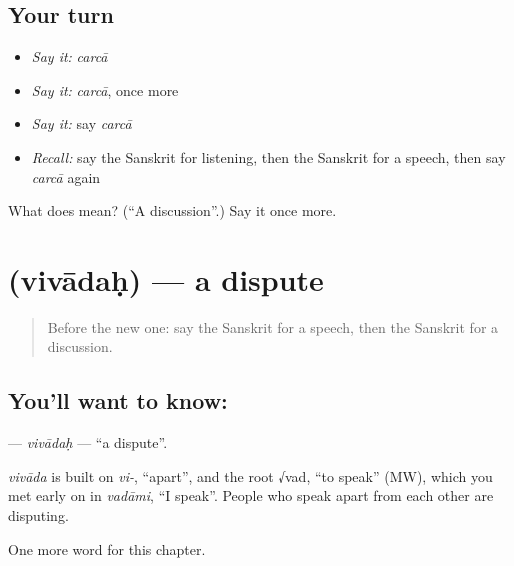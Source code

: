 \subsection*{Your turn}
\begin{itemize}
\raggedright
  \item \emph{Say it:} \emph{carcā}
  \item \emph{Say it:} \emph{carcā}, once more
  \item \emph{Say it:} say \emph{carcā}
  \item \emph{Recall:} say the Sanskrit for listening, then the Sanskrit for a speech, then say \emph{carcā} again
\end{itemize}

\begin{tcolorbox}[breakable,colback=teal!4,colframe=teal!35!black,title={Before you move on}]
What does  mean? (\textquotedblleft{}A discussion\textquotedblright{}.) Say it once more.
\end{tcolorbox}
\section[\texorpdfstring{\sk{विवादः} (vivādaḥ)}{विवादः (vivādaḥ)}]{ (vivādaḥ) — a dispute}

\label{lesson:SA-C200-vivadah}



\begin{quote}
Before the new one: say the Sanskrit for a speech, then the Sanskrit for a discussion.
\end{quote}

\subsection*{You'll want to know: }
\textbf{} — \emph{vivādaḥ} — \textquotedblleft{}a dispute\textquotedblright{}.

\begin{cousinweb}
\emph{vivāda} is built on \emph{vi-}, \textquotedblleft{}apart\textquotedblright{}, and the root √vad, \textquotedblleft{}to speak\textquotedblright{} (MW), which you met early on in \emph{vadāmi}, \textquotedblleft{}I speak\textquotedblright{}. People who speak apart from each other are disputing.
\end{cousinweb}

\begin{grammarlens}[title={What you've built}]
One more word for this chapter.
\end{grammarlens}


